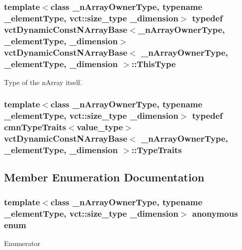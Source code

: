 \subsubsection[{This\+Type}]{\setlength{\rightskip}{0pt plus 5cm}template$<$class \+\_\+n\+Array\+Owner\+Type, typename \+\_\+element\+Type, vct\+::size\+\_\+type \+\_\+dimension$>$ typedef {\bf vct\+Dynamic\+Const\+N\+Array\+Base}$<$\+\_\+n\+Array\+Owner\+Type, \+\_\+element\+Type, \+\_\+dimension$>$ {\bf vct\+Dynamic\+Const\+N\+Array\+Base}$<$ \+\_\+n\+Array\+Owner\+Type, \+\_\+element\+Type, \+\_\+dimension $>$\+::{\bf This\+Type}}\label{classvct_dynamic_const_n_array_base_a5123caffcf1455a1b99003877eade897}
Type of the n\+Array itself. \hypertarget{classvct_dynamic_const_n_array_base_ab1fc145860fe50454edfcfbe8347ccc1}{}
\subsubsection[{Type\+Traits}]{\setlength{\rightskip}{0pt plus 5cm}template$<$class \+\_\+n\+Array\+Owner\+Type, typename \+\_\+element\+Type, vct\+::size\+\_\+type \+\_\+dimension$>$ typedef {\bf cmn\+Type\+Traits}$<$value\+\_\+type$>$ {\bf vct\+Dynamic\+Const\+N\+Array\+Base}$<$ \+\_\+n\+Array\+Owner\+Type, \+\_\+element\+Type, \+\_\+dimension $>$\+::{\bf Type\+Traits}}\label{classvct_dynamic_const_n_array_base_ab1fc145860fe50454edfcfbe8347ccc1}


\subsection{Member Enumeration Documentation}
\hypertarget{classvct_dynamic_const_n_array_base_a815ac316ebc1bb2ab1969d307549826f}{}\subsubsection[{anonymous enum}]{\setlength{\rightskip}{0pt plus 5cm}template$<$class \+\_\+n\+Array\+Owner\+Type, typename \+\_\+element\+Type, vct\+::size\+\_\+type \+\_\+dimension$>$ anonymous enum}\label{classvct_dynamic_const_n_array_base_a815ac316ebc1bb2ab1969d307549826f}
\begin{Desc}
\item[Enumerator]\par
\begin{description}
\item[{\em 
\hypertarget{classvct_dynamic_const_n_array_base_a815ac316ebc1bb2ab1969d307549826faf759c9ab831ff929b89af4ea2865a378}{}D\+I\+M\+E\+N\+S\+I\+O\+N\label{classvct_dynamic_const_n_array_base_a815ac316ebc1bb2ab1969d307549826faf759c9ab831ff929b89af4ea2865a378}
}]\end{description}
\end{Desc}



